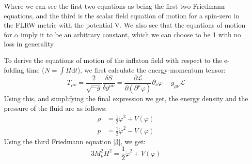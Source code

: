 \documentclass[aps,prd,reprint,preprintnumbers,showpacs,floatfix,nofootinbib,superscript address]{revtex4-2}
\begin{document}

Where we can see the first two equations as being the first two Friedmann equations, and the third is the scalar field equation of motion for a spin-zero in the FLRW metric with the potential V. We also see that the equations of motion for $\alpha$ imply it to be an arbitrary constant, which we can choose to be 1 with no loss in generality.

 To derive the equations of motion of the inflaton field with respect to the e-folding time ($N = \int H \text{d}t$), we first calculate the energy-momentum tensor: 
 \begin{equation} 
    T_{\mu\nu} = \frac{2}{\sqrt{-g}} \frac{\delta S}{\delta  g^{\mu \nu}} = \frac{\partial \mathcal{L}}{\partial (\partial^\mu \varphi)} \partial_\nu \varphi - g_{\mu\nu} \mathcal{L}
\end{equation}
Using this, and simplifying the final expression we get, the energy density and the pressure of the fluid are as follows: 
\begin{align}   \label{presure and density}
    \rho &= \frac{1}{2} \dot{\varphi}^2 + V(\varphi) \nonumber \\
    p &= \frac{1}{2} \dot{\varphi}^2 - V(\varphi)
\end{align}
Using the third Friedmann equation \ref{3}, we get:
\begin{equation}    \label{Friedmann 3}
    3 M_p^2H^2 = \frac{1}{2} \dot{\varphi}^2 + V(\varphi)
\end{equation}
\end{document}
